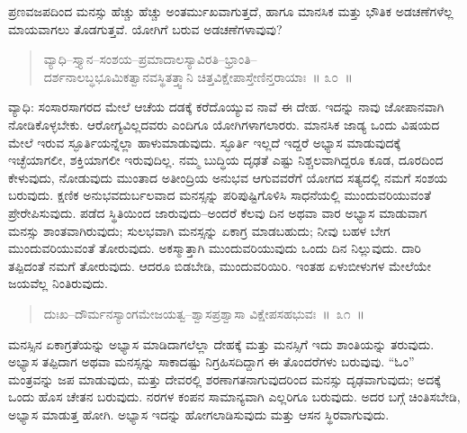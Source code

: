 
\vskip 0.2cm

ಪ್ರಣವಜಪದಿಂದ ಮನಸ್ಸು ಹೆಚ್ಚು ಹೆಚ್ಚು ಅಂತರ್ಮುಖವಾಗುತ್ತದೆ, ಹಾಗೂ ಮಾನಸಿಕ ಮತ್ತು ಭೌತಿಕ ಅಡಚಣೆಗಳೆಲ್ಲ ಮಾಯವಾಗಲು ತೊಡಗುತ್ತವೆ. ಯೋಗಿಗೆ ಬರುವ ಅಡಚಣೆಗಳಾವುವು?

\vspace{-0.3cm}

\begin{verse}
ವ್ಯಾಧಿ–ಸ್ತ್ಯಾನ–ಸಂಶಯ–ಪ್ರಮಾದಾಲಸ್ಯಾವಿರತಿ–ಭ್ರಾಂತಿ–\\ದರ್ಶನಾಲಬ್ಧಭೂಮಿಕತ್ವಾನವಸ್ಥಿತತ್ತ್ವಾನಿ ಚಿತ್ತವಿಕ್ಷೇಪಾಸ್ತೇಣಿನ್ತರಾಯಾಃ~॥ ೩೦~॥
\end{verse}

\vspace{-0.3cm}


ವ್ಯಾಧಿ: ಸಂಸಾರಸಾಗರದ ಮೇಲೆ ಆಚೆಯ ದಡಕ್ಕೆ ಕರೆದೊಯ್ಯುವ ನಾವೆ ಈ ದೇಹ. ಇದನ್ನು ನಾವು ಜೋಪಾನವಾಗಿ ನೋಡಿಕೊಳ್ಳಬೇಕು. ಆರೋಗ್ಯವಿಲ್ಲದವರು ಎಂದಿಗೂ ಯೋಗಿಗಳಾಗಲಾರರು. ಮಾನಸಿಕ ಜಾಡ್ಯ ಒಂದು ವಿಷಯದ ಮೇಲೆ ಇರುವ ಸ್ಫೂರ್ತಿಯನ್ನೆಲ್ಲಾ ಹಾಳುಮಾಡುವುದು. ಸ್ಫೂರ್ತಿ ಇಲ್ಲದೆ ಇದ್ದರೆ ಅಭ್ಯಾಸ ಮಾಡುವುದಕ್ಕೆ ಇಚ್ಛೆಯಾಗಲೀ, ಶಕ್ತಿಯಾಗಲೀ ಇರುವುದಿಲ್ಲ. ನಮ್ಮ ಬುದ್ಧಿಯ ದೃಢತೆ ಎಷ್ಟು ನಿಶ್ಚಲವಾಗಿದ್ದರೂ ಕೂಡ, ದೂರದಿಂದ ಕೇಳುವುದು, ನೋಡುವುದು ಮುಂತಾದ ಅತೀಂದ್ರಿಯ ಅನುಭವ ಆಗುವವರೆಗೆ ಯೋಗದ ಸತ್ಯದಲ್ಲಿ ನಮಗೆ ಸಂಶಯ ಬರುವುದು. ಕ್ಷಣಿಕ ಅನುಭವ\break ದುರ್ಬಲವಾದ ಮನಸ್ಸನ್ನು ಪರಿಪುಷ್ಟಿಗೊಳಿಸಿ ಸಾಧನೆಯಲ್ಲಿ ಮುಂದುವರಿಯುವಂತೆ ಪ್ರೇರೇಪಿಸುವುದು. ಪಡೆದ ಸ್ಥಿತಿಯಿಂದ ಜಾರುವುದು–ಅಂದರೆ ಕೆಲವು ದಿನ ಅಥವಾ ವಾರ ಅಭ್ಯಾಸ ಮಾಡುವಾಗ ಮನಸ್ಸು ಶಾಂತವಾಗಿರುವುದು; ಸುಲಭವಾಗಿ ಮನಸ್ಸನ್ನು ಏಕಾಗ್ರ ಮಾಡಬಹುದು; ನೀವು ಬಹಳ ಬೇಗ ಮುಂದುವರಿಯುವಂತೆ ತೋರುವುದು. ಅಕಸ್ಮಾತ್ತಾಗಿ ಮುಂದುವರಿಯುವುದು ಒಂದು ದಿನ ನಿಲ್ಲುವುದು. ದಾರಿ ತಪ್ಪಿದಂತೆ ನಮಗೆ ತೋರುವುದು. ಆದರೂ ಬಿಡಬೇಡಿ, ಮುಂದುವರಿಯಿರಿ. ಇಂತಹ ಏಳುಬೀಳುಗಳ ಮೇಲೆಯೇ ಜಯವೆಲ್ಲ ನಿಂತಿರುವುದು. 

\vspace{-0.3cm}

\begin{verse}
ದುಃಖ–ದೌರ್ಮನಸ್ಯಾಂಗಮೇಜಯತ್ವ–ಶ್ವಾಸಪ್ರಶ್ವಾಸಾ ವಿಕ್ಷೇಪಸಹಭುವಃ~॥~೩೧~॥
\end{verse}

\vspace{-0.3cm}


ಮನಸ್ಸಿನ ಏಕಾಗ್ರತೆಯನ್ನು ಅಭ್ಯಾಸ ಮಾಡಿದಾಗಲೆಲ್ಲಾ ದೇಹಕ್ಕೆ ಮತ್ತು ಮನಸ್ಸಿಗೆ ಇದು ಶಾಂತಿಯನ್ನು ತರುವುದು. ಅಭ್ಯಾಸ ತಪ್ಪಿದಾಗ ಅಥವಾ ಮನಸ್ಸನ್ನು ಸಾಕಾದಷ್ಟು ನಿಗ್ರಹಿಸದಿದ್ದಾಗ ಈ ತೊಂದರೆಗಳು ಬರುವುವು. “ಓಂ” ಮಂತ್ರವನ್ನು ಜಪ ಮಾಡುವುದು, ಮತ್ತು ದೇವರಲ್ಲಿ ಶರಣಾಗತನಾಗುವುದರಿಂದ ಮನಸ್ಸು ದೃಢವಾಗುವುದು; ಅದಕ್ಕೆ ಒಂದು ಹೊಸ ಚೇತನ ಬರುವುದು. ನರಗಳ ಕಂಪನ ಸಾಮಾನ್ಯವಾಗಿ ಎಲ್ಲರಿಗೂ ಬರುವುದು. ಅದರ ಬಗ್ಗೆ ಚಿಂತಿಸಬೇಡಿ, ಅಭ್ಯಾಸ ಮಾಡುತ್ತ ಹೋಗಿ. ಅಭ್ಯಾಸ ಇದನ್ನು ಹೋಗಲಾಡಿಸುವುದು ಮತ್ತು ಆಸನ ಸ್ಥಿರವಾಗುವುದು. 

